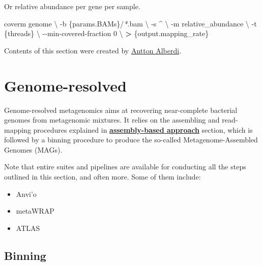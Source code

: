 \documentclass[
]{book}
\newenvironment{Shaded}{\begin{snugshade}}{\end{snugshade}}
\newcommand{\AttributeTok}[1]{\textcolor[rgb]{0.13,0.29,0.53}{#1}}
\newcommand{\DataTypeTok}[1]{\textcolor[rgb]{0.13,0.29,0.53}{#1}}
\newcommand{\ExtensionTok}[1]{#1}
\newcommand{\NormalTok}[1]{#1}
\newcommand{\OperatorTok}[1]{\textcolor[rgb]{0.81,0.36,0.00}{\textbf{#1}}}
\newcommand{\PreprocessorTok}[1]{\textcolor[rgb]{0.56,0.35,0.01}{\textit{#1}}}
\providecommand{\tightlist}{%
  \setlength{\itemsep}{0pt}\setlength{\parskip}{0pt}}
\begin{document}
\normalsize

Or relative abundance per gene per sample.

\small

\begin{Shaded}
\begin{Highlighting}[]
\ExtensionTok{coverm}\NormalTok{ genome }\DataTypeTok{\textbackslash{}}
      \AttributeTok{{-}b}\NormalTok{ \{params.BAMs\}/}\PreprocessorTok{*}\NormalTok{.bam }\DataTypeTok{\textbackslash{}}
      \AttributeTok{{-}s}\NormalTok{ \^{} }\DataTypeTok{\textbackslash{}}
      \AttributeTok{{-}m}\NormalTok{ relative\_abundance }\DataTypeTok{\textbackslash{}}
      \AttributeTok{{-}t}\NormalTok{ \{threads\} }\DataTypeTok{\textbackslash{}}
      \AttributeTok{{-}{-}min{-}covered{-}fraction}\NormalTok{ 0 }\DataTypeTok{\textbackslash{}}
      \OperatorTok{\textgreater{}}\NormalTok{ \{output.mapping\_rate\}}
\end{Highlighting}
\end{Shaded}

\normalsize

Contents of this section were created by \protect\hyperlink{antton-alberdi}{Antton Alberdi}.

\hypertarget{genome-resolved}{%
\section{Genome-resolved}\label{genome-resolved}}

Genome-resolved metagenomics aims at recovering near-complete bacterial genomes from metagenomic mixtures. It relies on the assembling and read-mapping procedures explained in \textbf{\protect\hyperlink{assembly-based}{assembly-based approach}} section, which is followed by a binning procedure to produce the so-called Metagenome-Assembled Genomes (MAGs).

Note that entire suites and pipelines are available for conducting all the steps outlined in this section, and often more. Some of them include:

\begin{itemize}
\tightlist
\item
  Anvi'o
\item
  metaWRAP
\item
  ATLAS
\end{itemize}

\hypertarget{genome-resolved-binning}{%
\subsection*{Binning}\label{genome-resolved-binning}}
\end{document}
